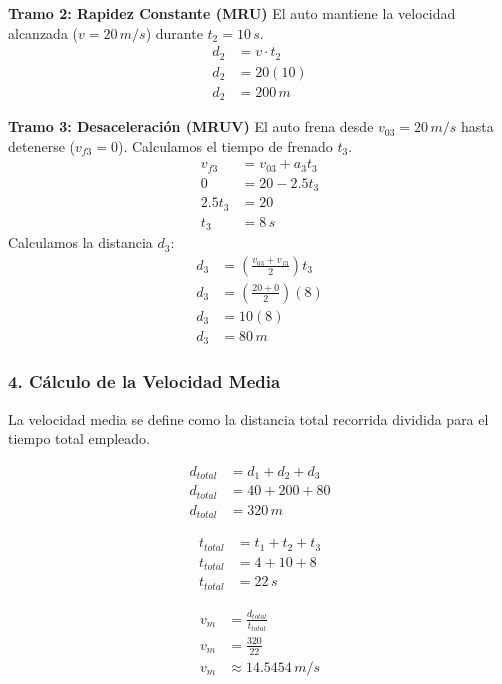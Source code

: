 \documentclass[12pt, a4paper]{article}
\begin{document}
\textbf{Tramo 2: Rapidez Constante (MRU)}
El auto mantiene la velocidad alcanzada ($v = 20 \, \si{m/s}$) durante $t_2 = 10 \, \si{s}$.
\begin{align*}
d_2 &= v \cdot t_2 \\
d_2 &= 20(10) \\
d_2 &= 200 \, \si{m}
\end{align*}

\textbf{Tramo 3: Desaceleración (MRUV)}
El auto frena desde $v_{03} = 20 \, \si{m/s}$ hasta detenerse ($v_{f3} = 0$). Calculamos el tiempo de frenado $t_3$.
\begin{align*}
v_{f3} &= v_{03} + a_3 t_3 \\
0 &= 20 - 2.5 t_3 \\
2.5 t_3 &= 20 \\
t_3 &= 8 \, \si{s}
\end{align*}
Calculamos la distancia $d_3$:
\begin{align*}
d_3 &= \left( \frac{v_{03} + v_{f3}}{2} \right) t_3 \\
d_3 &= \left( \frac{20 + 0}{2} \right) (8) \\
d_3 &= 10(8) \\
d_3 &= 80 \, \si{m}
\end{align*}

\subsubsection*{4. Cálculo de la Velocidad Media}
La velocidad media se define como la distancia total recorrida dividida para el tiempo total empleado.

\begin{align*}
d_{total} &= d_1 + d_2 + d_3 \\
d_{total} &= 40 + 200 + 80 \\
d_{total} &= 320 \, \si{m}
\end{align*}

\begin{align*}
t_{total} &= t_1 + t_2 + t_3 \\
t_{total} &= 4 + 10 + 8 \\
t_{total} &= 22 \, \si{s}
\end{align*}

\begin{align*}
v_m &= \frac{d_{total}}{t_{total}} \\
v_m &= \frac{320}{22} \\
v_m &\approx 14.5454 \, \si{m/s}
\end{align*}
\end{document}
